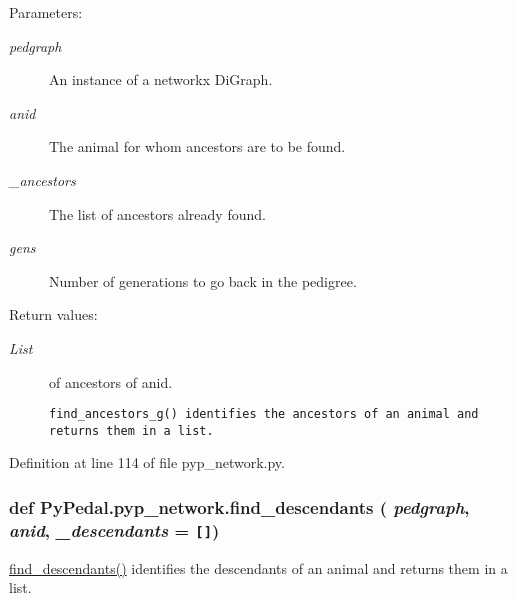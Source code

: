 \begin{Desc}
\item[Parameters:]
\begin{description}
\item[{\em pedgraph}]An instance of a networkx Di\-Graph. \item[{\em anid}]The animal for whom ancestors are to be found. \item[{\em \_\-ancestors}]The list of ancestors already found. \item[{\em gens}]Number of generations to go back in the pedigree. \end{description}
\end{Desc}
\begin{Desc}
\item[Return values:]
\begin{description}
\item[{\em List}]of ancestors of anid.

\footnotesize\begin{verbatim}find_ancestors_g() identifies the ancestors of an animal and returns them in a list.
\end{verbatim}
\normalsize
 \end{description}
\end{Desc}


Definition at line 114 of file pyp\_\-network.py.\hypertarget{namespacePyPedal_1_1pyp__network_868b8569bf54f00cdc197ed911082cc2}{
\subsubsection[find\_\-descendants]{\setlength{\rightskip}{0pt plus 5cm}def Py\-Pedal.pyp\_\-network.find\_\-descendants ( {\em pedgraph},  {\em anid},  {\em \_\-descendants} = {\tt \mbox{[}\mbox{]}})}}
\label{namespacePyPedal_1_1pyp__network_868b8569bf54f00cdc197ed911082cc2}


\hyperlink{namespacePyPedal_1_1pyp__network_868b8569bf54f00cdc197ed911082cc2}{find\_\-descendants()} identifies the descendants of an animal and returns them in a list. 

